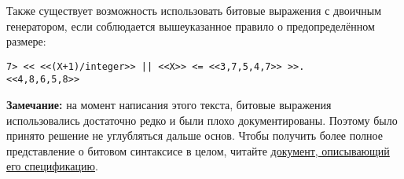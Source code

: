 Также существует возможность использовать битовые выражения с двоичным генератором, если соблюдается вышеуказанное правило о предопределённом размере:
\begin{lstlisting}[style=repl]
7> << <<(X+1)/integer>> || <<X>> <= <<3,7,5,4,7>> >>.
<<4,8,6,5,8>>
\end{lstlisting}
\colorbox{lgray}
{
    \begin{minipage}{\linewidth}
        \textbf{Замечание:} на момент написания этого текста, битовые выражения использовались достаточно редко и были плохо документированы.
        Поэтому было принято решение не углубляться дальше основ.
        Чтобы получить более полное представление о битовом синтаксисе в целом, читайте \href{http://user.it.uu.se/~pergu/papers/erlang05.pdf}{документ, описывающий его спецификацию}.
    \end{minipage}
}
